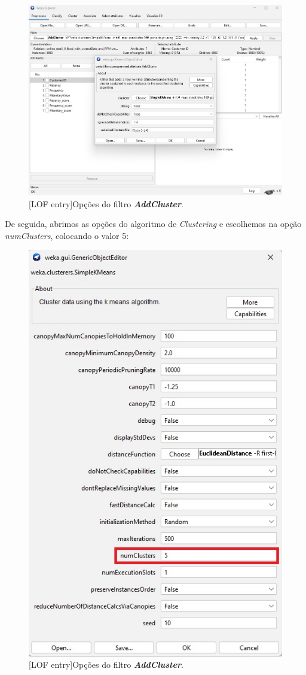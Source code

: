 \documentclass{easychair}
\begin{document}
\begin{figure}[H]
    \begin{centering}
    \includegraphics[width=1\linewidth]{imagens/figure17.jpg}\label{cap-4-fig17}
    [LOF entry]{Opções do filtro \textit{\textbf{AddCluster}}.}
    \label{fig17}
    \end{centering}
\end{figure}

De seguida, abrimos as opções do algoritmo de \textit{Clustering} e escolhemos na opção \textit{numClusters}, colocando o valor 5:

\begin{figure}[H]
    \begin{centering}
    \includegraphics[width=0.4\linewidth]{imagens/figure18.jpg}\label{cap-4-fig18}
    [LOF entry]{Opções do filtro \textit{\textbf{AddCluster}}.}
    \label{fig18}
    \end{centering}
\end{figure}
\end{document}
